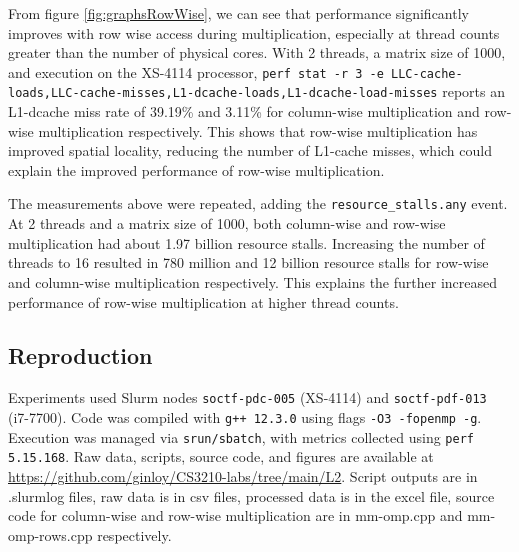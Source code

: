 \documentclass{article}
\begin{document}
From figure \ref{fig:graphsRowWise}, we can see that performance significantly improves with row wise access during multiplication, especially at thread counts greater than the number of physical cores. With 2 threads, a matrix size of 1000, and execution on the XS-4114 processor, \texttt{perf stat -r 3 -e LLC-cache-loads,LLC-cache-misses,L1-dcache-loads,L1-dcache-load-misses} reports an L1-dcache miss rate of 39.19\% and 3.11\% for column-wise multiplication and row-wise multiplication respectively. This shows that row-wise multiplication has improved spatial locality, reducing the number of L1-cache misses, which could explain the improved performance of row-wise multiplication.

The measurements above were repeated, adding the \texttt{resource\_stalls.any} event. At 2 threads and a matrix size of 1000, both column-wise and row-wise multiplication had about 1.97 billion resource stalls. Increasing the number of threads to 16 resulted in 780 million and 12 billion resource stalls for row-wise and column-wise multiplication respectively. This explains the further increased performance of row-wise multiplication at higher thread counts.

\newpage

\begin{appendices}

\section{Reproduction}
Experiments used Slurm nodes \texttt{soctf-pdc-005} (XS-4114) and \texttt{soctf-pdf-013} (i7-7700). Code was compiled with \texttt{g++ 12.3.0} using flags \texttt{-O3 -fopenmp -g}. Execution was managed via \texttt{srun/sbatch}, with metrics collected using \texttt{perf 5.15.168}. Raw data, scripts, source code, and figures are available at \url{https://github.com/ginloy/CS3210-labs/tree/main/L2}. Script outputs are in .slurmlog files, raw data is in csv files, processed data is in the excel file, source code for column-wise and row-wise multiplication are in mm-omp.cpp and mm-omp-rows.cpp respectively.

\end{appendices}
\end{document}
